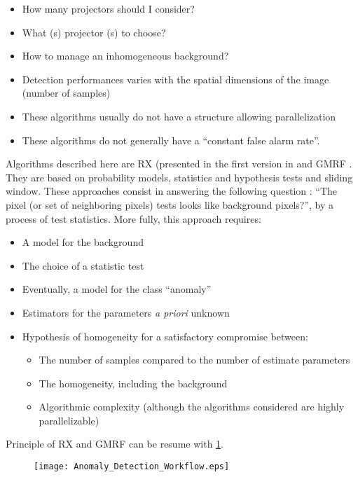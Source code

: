 \begin{itemize} 
\item How many projectors should I consider?  
\item What (s) projector (s) to choose?  
\item How to manage an inhomogeneous background?  
\item Detection performances varies with the spatial dimensions of the image (number of samples) 
\item These algorithms usually do not have a structure allowing parallelization
\item These algorithms do not generally have a ``constant false alarm rate''.
\end{itemize}

Algorithms described here are RX (presented in the first version
in \cite{Reed1990} and GMRF \cite{Schweizer2001}. They are based on probability models, statistics and hypothesis tests and
sliding window. These approaches consist in answering the following question : ``The pixel (or set of neighboring pixels) tests looks like background pixels?'', by a process of test
statistics. More fully, this approach requires:

\begin{itemize} 
\item A model for the background 
\item The choice of a statistic test 
\item Eventually, a model for the class ``anomaly''
\item Estimators for the parameters \textit{a priori} unknown
\item Hypothesis of homogeneity for a satisfactory compromise between:
\begin{itemize} 
\item The number of samples compared to the number of estimate parameters 
\item The homogeneity, including the background 
\item Algorithmic complexity (although the algorithms considered are
highly parallelizable)
\end{itemize} 
\end{itemize} 
Principle of RX and GMRF can be resume with \ref{fig:workflow_anomaly}.

\begin{figure}[h]
  \centering
  \texttt{[image: Anomaly\_Detection\_Workflow.eps]}
  \label{fig:workflow_anomaly}
\end{figure}

